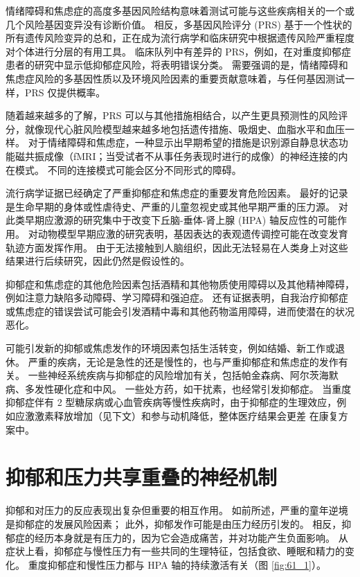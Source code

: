 情绪障碍和焦虑症的高度多基因风险结构意味着测试可能与这些疾病相关的一个或几个风险基因变异没有诊断价值。
相反，多基因风险评分 (PRS) 基于一个性状的所有遗传风险变异的总和，正在成为流行病学和临床研究中根据遗传风险严重程度对个体进行分层的有用工具。
临床队列中有差异的 PRS，例如，在对重度抑郁症患者的研究中显示低抑郁症风险，将表明错误分类。
需要强调的是，情绪障碍和焦虑症风险的多基因性质以及环境风险因素的重要贡献意味着，与任何基因测试一样，PRS 仅提供概率。


随着越来越多的了解，PRS 可以与其他措施相结合，以产生更具预测性的风险评分，就像现代心脏风险模型越来越多地包括遗传措施、吸烟史、血脂水平和血压一样。
对于情绪障碍和焦虑症，一种显示出早期希望的措施是识别源自静息状态功能磁共振成像（fMRI；当受试者不从事任务表现时进行的成像）的神经连接的内在模式。
不同的连接模式可能会区分不同形式的障碍。


流行病学证据已经确定了严重抑郁症和焦虑症的重要发育危险因素。
最好的记录是生命早期的身体或性虐待史、严重的儿童忽视史或其他早期严重的压力源。
对此类早期应激源的研究集中于改变下丘脑-垂体-肾上腺 (HPA) 轴反应性的可能作用。
对动物模型早期应激的研究表明，基因表达的表观遗传调控可能在改变发育轨迹方面发挥作用。
由于无法接触到人脑组织，因此无法轻易在人类身上对这些结果进行后续研究，因此仍然是假设性的。


抑郁症和焦虑症的其他危险因素包括酒精和其他物质使用障碍以及其他精神障碍，例如注意力缺陷多动障碍、学习障碍和强迫症。
还有证据表明，自我治疗抑郁症或焦虑症的错误尝试可能会引发酒精中毒和其他药物滥用障碍，进而使潜在的状况恶化。


可能引发新的抑郁或焦虑发作的环境因素包括生活转变，例如结婚、新工作或退休。
严重的疾病，无论是急性的还是慢性的，也与严重抑郁症和焦虑症的发作有关。
一些神经系统疾病与抑郁症的风险增加有关，包括帕金森病、阿尔茨海默病、多发性硬化症和中风。
一些处方药，如干扰素，也经常引发抑郁症。
当重度抑郁症伴有 2 型糖尿病或心血管疾病等慢性疾病时，由于抑郁症的生理效应，例如应激激素释放增加（见下文）和参与动机降低，整体医疗结果会更差 在康复方案中。



\section{抑郁和压力共享重叠的神经机制}

抑郁和对压力的反应表现出复杂但重要的相互作用。
如前所述，严重的童年逆境是抑郁症的发展风险因素；
此外，抑郁发作可能是由压力经历引发的。
相反，抑郁症的经历本身就是有压力的，因为它会造成痛苦，并对功能产生负面影响。
从症状上看，抑郁症与慢性压力有一些共同的生理特征，包括食欲、睡眠和精力的变化。
重度抑郁症和慢性压力都与 HPA 轴的持续激活有关（图 \ref{fig:61_1}）。


